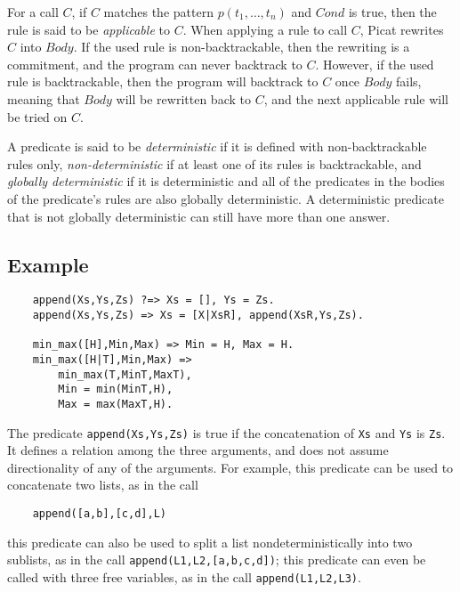 For a call $C$, if $C$ matches the pattern $p(t_1,\ldots,t_n)$ and $Cond$ is true, then the rule is said to be \emph{applicable} to $C$. When applying a rule to call $C$, Picat rewrites $C$ into $Body$. If the used rule is non-backtrackable, then the rewriting is a commitment, and the program can never backtrack to $C$. However, if the used rule is backtrackable, then the program will backtrack to $C$ once $Body$ fails, meaning that $Body$ will be rewritten back to $C$, and the next applicable rule will be tried on $C$. 

A predicate is said to be \emph{deterministic} if it is defined with non-backtrackable rules only, \emph{non-deterministic} if at least one of its rules is backtrackable, and \emph{globally deterministic} if it is deterministic and all of the predicates in the bodies of the predicate's rules are also globally deterministic. A deterministic predicate that is not globally deterministic can still have more than one answer. 

\subsection*{Example}
\begin{verbatim}
    append(Xs,Ys,Zs) ?=> Xs = [], Ys = Zs.
    append(Xs,Ys,Zs) => Xs = [X|XsR], append(XsR,Ys,Zs).

    min_max([H],Min,Max) => Min = H, Max = H.
    min_max([H|T],Min,Max) => 
        min_max(T,MinT,MaxT), 
        Min = min(MinT,H),
        Max = max(MaxT,H).
\end{verbatim}
The predicate \texttt{append(Xs,Ys,Zs)} is true if the concatenation of \texttt{Xs} and \texttt{Ys} is \texttt{Zs}. It defines a relation among the three arguments, and does not assume directionality of any of the arguments. For example, this predicate can be used to concatenate two lists, as in the call 
\begin{verbatim}
    append([a,b],[c,d],L)
\end{verbatim}
this predicate can also be used to split a list nondeterministically into two sublists, as in the call \texttt{append(L1,L2,[a,b,c,d])}; this predicate can even be called with three free variables, as in the call \texttt{append(L1,L2,L3)}. 

